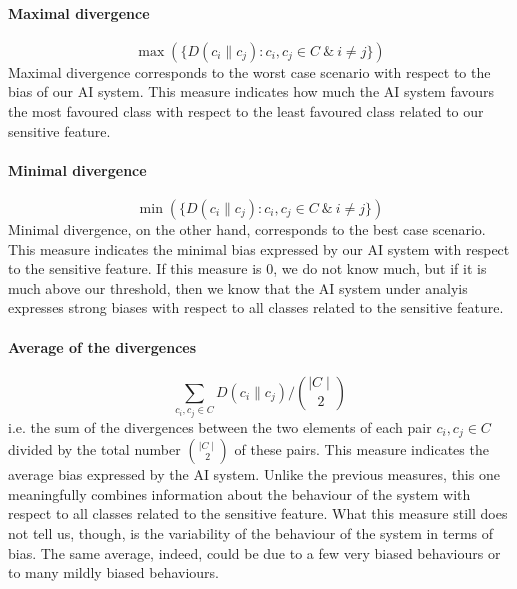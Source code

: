 \documentclass[
]{ceurart}
\begin{document}
\paragraph{Maximal divergence}

$$\max (\{D(c_i\parallel c_j): c_i,c_j\in C\ \&\ i\neq j\})$$
Maximal divergence corresponds to the worst case scenario with respect to the bias of our AI system. This measure indicates how much the AI system favours the most favoured class with respect to the least favoured class related to our sensitive feature.

\paragraph{Minimal divergence}
$$\min (\{D(c_i\parallel c_j): c_i,c_j\in C\ \&\ i\neq j\})$$
Minimal divergence, on the other hand, corresponds to the best case scenario.  This measure indicates the minimal bias expressed by our AI system with respect to the sensitive feature. If this measure is $0$, we do not know much, but if it is much above our threshold, then we know that the AI system under analyis expresses strong biases with respect to all classes related to the sensitive feature.


\paragraph{Average of the divergences}
$$\sum_{c_i,c_j\in C} D(c_i\parallel c_j)/\binom{\mid C\mid}{2}$$
i.e. the sum of the divergences between the two elements of each pair $c_i,c_j\in C$ divided by the total number $\binom{\mid C\mid}{2}$ of these pairs. This measure indicates the average bias expressed by the AI system. Unlike the previous measures, this one meaningfully combines information about the behaviour of the system with respect to all classes related to the sensitive feature.  What this measure still does not tell us, though, is the variability of the behaviour of the system in terms of bias. The same average, indeed, could be due to a few very biased behaviours or to many mildly biased behaviours.
\end{document}
